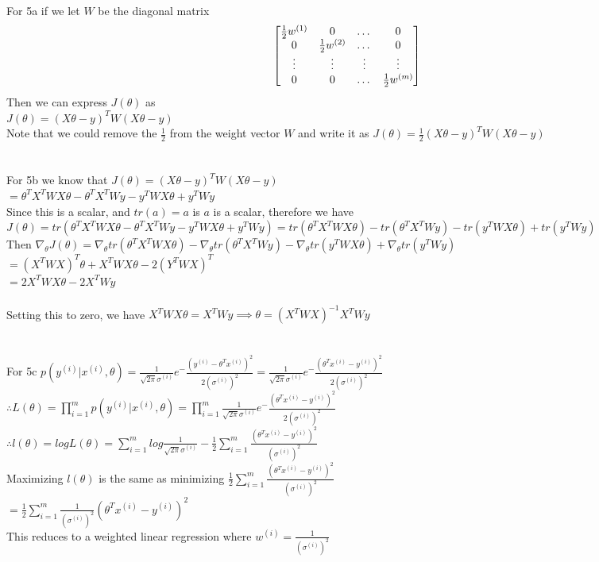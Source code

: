\begin{answer}\\
For 5a if we let $W$ be the diagonal matrix\\
\[
\begin{bmatrix}
\frac{1}{2}w^{(1)} & 0 & \dots & 0 \\
0 & \frac{1}{2}w^{(2)} & \dots & 0 \\
\vdots & \vdots & \vdots  & \vdots \\
0 & 0 & \dots & \frac{1}{2}w^{(m)} \\
\end{bmatrix}\\
\]
Then we can express $J(\theta)$ as \\
$J(\theta)=(X \theta - y)^TW(X \theta -y)$\\
Note that we could remove the $\frac{1}{2}$ from the weight vector $W$ and write it as $J(\theta)=\frac{1}{2}(X \theta - y)^TW(X \theta -y)$ \\\\\\
For 5b we know that $J(\theta)=(X\theta-y)^TW(X\theta-y)$\\
$=\theta^TX^TWX\theta -\theta^TX^TWy-y^TWX\theta+y^TWy$\\
Since this is a scalar, and $tr(a)=a$ is $a$ is a scalar, therefore we have\\
$J(\theta)=tr(\theta^TX^TWX\theta -\theta^TX^TWy-y^TWX\theta+y^TWy)=tr(\theta^TX^TWX\theta) -tr(\theta^TX^TWy)-tr(y^TWX\theta)+tr(y^TWy)$\\
Then $\nabla_{\theta}J(\theta)=\nabla_{\theta}tr(\theta^TX^TWX\theta) -\nabla_{\theta}tr(\theta^TX^TWy)-\nabla_{\theta}tr(y^TWX\theta)+\nabla_{\theta}tr(y^TWy)$\\
$=(X^TWX)^T\theta+X^TWX\theta-2(Y^TWX)^T$\\
$=2X^TWX\theta-2X^TWy$\\\\
Setting this to zero, we have
$X^TWX\theta=X^TWy \implies \theta=(X^TWX)^{-1}X^TWy$\\
\\
\\
For 5c $p(y^{(i)}|x^{(i)},\theta)=\frac{1}{\sqrt{2 \pi} \sigma^{(i)}} e^-\frac{(y^{(i)}-\theta^Tx^{(i)})^2}{2(\sigma^{(i)})^2}=\frac{1}{\sqrt{2 \pi} \sigma^{(i)}} e^-\frac{(\theta^Tx^{(i)}-y^{(i)})^2}{2(\sigma^{(i)})^2}$\\
$\therefore L(\theta)=\prod_{i=1}^{m}p(y^{(i)}|x^{(i)},\theta)=\prod_{i=1}^{m}\frac{1}{\sqrt{2 \pi} \sigma^{(i)}} e^-\frac{(\theta^Tx^{(i)}-y^{(i)})^2}{2(\sigma^{(i)})^2}$\\
$\therefore l(\theta)=log L(\theta)=\sum_{i=1}^{m}log\frac{1}{\sqrt{2 \pi}\sigma^{(i)}} -\frac{1}{2}\sum_{i=1}^{m}\frac{(\theta^T x^{(i)}-y^{(i)})^2}{(\sigma^{(i)})^2}$\\
Maximizing $l(\theta)$ is the same as minimizing $\frac{1}{2}\sum_{i=1}^{m}\frac{(\theta^T x^{(i)}-y^{(i)})^2}{(\sigma^{(i)})^2}$\\
$=\frac{1}{2}\sum_{i=1}^{m}\frac{1}{(\sigma^{(i)})^2} (\theta^T x^{(i)}-y^{(i)})^2$\\
This reduces to a weighted linear regression where $w^{(i)}=\frac{1}{(\sigma^{(i)})^2}$
\end{answer}
